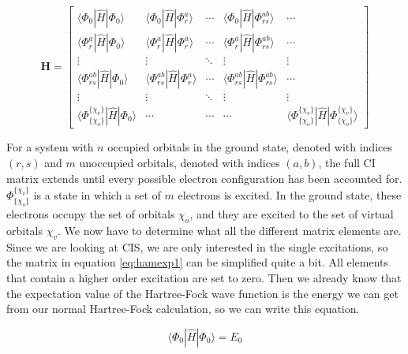 \documentclass[twoside,twocolumn,9pt]{article}
\begin{document}
\begin{equation}\label{eq:hamexp1}
  \boldsymbol{H} = \begin{bmatrix}
    \langle \Phi_0 | \hat{H} | \Phi_0 \rangle         & \langle \Phi_0 | \hat{H} | \Phi_r^a \rangle         & \cdots & \langle \Phi_0 | \hat{H} | \Phi_{rs}^{ab} \rangle         & \cdots \\
    \langle \Phi_r^a | \hat{H} | \Phi_0 \rangle       & \langle \Phi_r^a | \hat{H} | \Phi_r^a \rangle       & \cdots & \langle \Phi_r^a |\hat{H} | \Phi_{rs}^{ab} \rangle        & \cdots \\
    \vdots                                            & \vdots                                          & \ddots & \vdots                                                    & \vdots \\
    \langle \Phi_{rs}^{ab} | \hat{H} | \Phi_0 \rangle & \langle \Phi_{rs}^{ab} | \hat{H} | \Phi_r^a \rangle & \cdots & \langle \Phi_{rs}^{ab} | \hat{H} | \Phi_{rs}^{ab} \rangle & \cdots \\
    \vdots                                            & \vdots                                              & \ddots & \vdots & \vdots \\
    \langle \Phi_{\{\chi_o\}}^{\{\chi_v\}} | \hat{H} | \Phi_0 \rangle & \cdots & \cdots & \cdots & \langle \Phi_{\{\chi_o\}}^{\{\chi_v\}} | \hat{H} | \Phi_{\{\chi_o\}}^{\{\chi_v\}} \rangle
  \end{bmatrix}
\end{equation}

For a system with $n$ occupied orbitals in the ground state, denoted with indices $(r, s)$ and $m$ unoccupied orbitals, denoted with indices $(a,b)$, the full CI matrix extends until
every possible electron configuration has been accounted for. $\Phi_{\{\chi_o\}}^{\{\chi_v\}}$ is a state in which a set of $m$ electrons is excited. In the ground state, these 
electrons occupy the set of orbitals {$\chi_o$}, and they are excited to the set of virtual orbitals {$\chi_v$}.
We now have to determine what all the different matrix elements are. Since we are looking at CIS, we are only interested in the single excitations, so the matrix in equation
\eqref{eq:hamexp1} can be simplified quite a bit. All elements that contain a higher order excitation are set to zero. Then we already know that the expectation value of the Hartree-Fock wave function is the energy we can get from our normal
Hartree-Fock calculation, so we can write this equation.

\begin{equation}\label{eq:E0}
  \langle \Phi_0 | \hat{H} | \Phi_0 \rangle = E_0
\end{equation}
\end{document}
